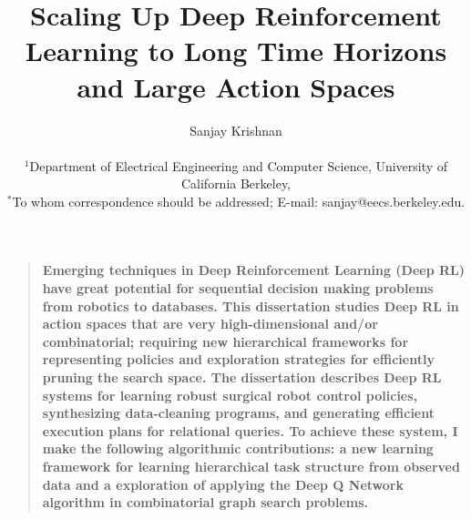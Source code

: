 \documentclass[12pt]{book}
\title{Scaling Up Deep Reinforcement Learning to Long Time Horizons and Large Action Spaces}
\author
{Sanjay Krishnan\\
\\
\normalsize{$^{1}$Department of Electrical Engineering and Computer Science, University of California Berkeley,}\\
\normalsize{$^\ast$To whom correspondence should be addressed; E-mail:  sanjay@eecs.berkeley.edu.}
}
\date{}
\newenvironment{sciabstract}{%
\begin{quote} \bf}
{\end{quote}}
\begin{document}
 


\baselineskip26pt


\maketitle 





\begin{sciabstract}
Emerging techniques in Deep Reinforcement
Learning (Deep RL) have great potential for sequential decision making problems from robotics to databases. This dissertation studies Deep RL in action spaces that are very high-dimensional and/or combinatorial; requiring new hierarchical frameworks for representing policies and exploration strategies for efficiently pruning the search space. The dissertation describes  Deep RL systems for learning robust surgical robot control policies, synthesizing data-cleaning programs, and generating efficient execution plans for relational queries. To achieve these system, I make the following algorithmic contributions: a new learning framework for learning hierarchical task structure from observed data and a exploration of applying the Deep Q Network algorithm in combinatorial graph search problems.
\end{sciabstract}


\clearpage

\tableofcontents

\clearpage





















\end{document}
